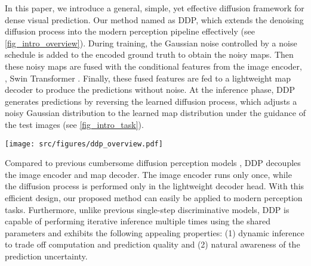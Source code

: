 \documentclass[10pt,twocolumn,letterpaper]{article}
\newcommand{\ours}[0]{DDP\xspace}
\begin{document}
In this paper, we introduce a general, simple, yet effective diffusion framework for dense visual prediction.
Our method named as DDP, which extends the denoising diffusion process into
the modern perception pipeline effectively (see \cref{fig_intro_overview}).
During training, the Gaussian noise controlled by a noise schedule \cite{nichol2021improved} is added to the encoded ground truth to obtain the noisy maps.
Then these noisy maps are fused with the conditional features from the image encoder, \eg, Swin Transformer \cite{liu2021swin}.
Finally, these fused features are fed to a lightweight map decoder to produce the predictions without noise.
At the inference phase, \ours generates predictions by reversing the learned diffusion process, which adjusts a noisy Gaussian distribution to the learned map distribution under the guidance of the test images (see \cref{fig_intro_task}).


\begin{figure*}[t!]
    \centering
    \texttt{[image: src/figures/ddp\_overview.pdf]}
    \caption{\textbf{The proposed \ours framework}. The image encoder extracts feature representation from the input image  as the condition. The map decoder takes the noisy map  as input and produces the denoised prediction under the guidance. During training, the noisy map  is constructed by adding Gaussian noise to the encoded ground truth. In inference, the noisy map  is randomly sampled from the Gaussian distribution and iteratively refined to obtain the desired prediction .
     }
    \label{fig_intro_overview}
\end{figure*}

Compared to previous cumbersome diffusion perception models \cite{wu2022medsegdiff,wolleb2022diffusion,saxena2023depthgen}, \ours decouples the image encoder and map decoder. The image encoder runs only once, while the diffusion process is performed only in the lightweight decoder head.
With this efficient design, our proposed method can easily be applied to modern perception tasks.
Furthermore, unlike previous single-step discriminative models, \ours is capable of performing iterative inference multiple times using the shared parameters and exhibits the following appealing properties: (1) dynamic inference to trade off computation and prediction quality and (2) natural awareness of the prediction uncertainty.
\end{document}
